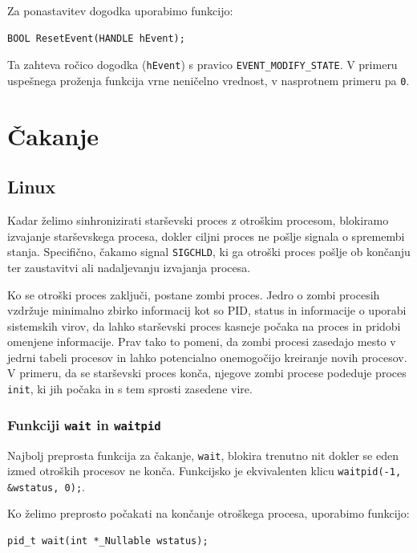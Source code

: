 \documentclass[a4paper,12pt,openright]{book}
\begin{document}
Za ponastavitev dogodka uporabimo funkcijo:
\begin{lstlisting}[style=func]
 BOOL ResetEvent(HANDLE hEvent);
\end{lstlisting}

Ta zahteva ročico dogodka (\texttt{hEvent}) s pravico \texttt{EVENT\_MODIFY\_STATE}.
V primeru uspešnega proženja funkcija vrne neničelno vrednost, v nasprotnem primeru pa \texttt{0}.

\section{Čakanje}

\subsection{Linux} \label{ssec:linux_syscalls:waiting}

Kadar želimo sinhronizirati starševski proces z otroškim procesom, blokiramo izvajanje starševskega procesa, dokler ciljni proces ne pošlje signala o spremembi stanja.
Specifično, čakamo signal \texttt{SIGCHLD}, ki ga otroški proces pošlje ob končanju ter zaustavitvi ali nadaljevanju izvajanja procesa.

Ko se otroški proces zaključi, postane zombi proces.
Jedro o zombi procesih vzdržuje minimalno zbirko informacij kot so PID, status in informacije o uporabi sistemskih virov, da lahko starševski proces kasneje počaka na proces in pridobi omenjene informacije.
Prav tako to pomeni, da zombi procesi zasedajo mesto v jedrni tabeli procesov in lahko potencialno onemogočijo kreiranje novih procesov.
V primeru, da se starševski proces konča, njegove zombi procese podeduje proces \texttt{init}, ki jih počaka in s tem sprosti zasedene vire.

\subsubsection{Funkciji \texttt{wait} in \texttt{waitpid}}

Najbolj preprosta funkcija za čakanje, \texttt{wait}, blokira trenutno nit dokler se eden izmed otroških procesov ne konča.
Funkcijsko je ekvivalenten klicu \verb|waitpid(-1, &wstatus, 0);|.

Ko želimo preprosto počakati na končanje otroškega procesa, uporabimo funkcijo:
\begin{lstlisting}[style=func]
 pid_t wait(int *_Nullable wstatus);
\end{lstlisting}
\end{document}
